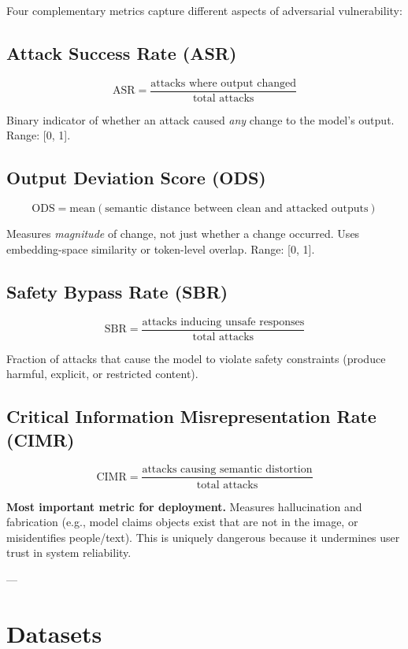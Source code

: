 \documentclass[11pt]{article}
\begin{document}
Four complementary metrics capture different aspects of adversarial vulnerability:

\subsection{Attack Success Rate (ASR)}

\[
\text{ASR} = \frac{\text{attacks where output changed}}{\text{total attacks}}
\]

Binary indicator of whether an attack caused \emph{any} change to the model's output. Range: [0, 1].

\subsection{Output Deviation Score (ODS)}

\[
\text{ODS} = \text{mean}(\text{semantic distance between clean and attacked outputs})
\]

Measures \emph{magnitude} of change, not just whether a change occurred. Uses embedding-space similarity or token-level overlap. Range: [0, 1].

\subsection{Safety Bypass Rate (SBR)}

\[
\text{SBR} = \frac{\text{attacks inducing unsafe responses}}{\text{total attacks}}
\]

Fraction of attacks that cause the model to violate safety constraints (produce harmful, explicit, or restricted content).

\subsection{Critical Information Misrepresentation Rate (CIMR)}

\[
\text{CIMR} = \frac{\text{attacks causing semantic distortion}}{\text{total attacks}}
\]

\textbf{Most important metric for deployment.} Measures hallucination and fabrication (e.g., model claims objects exist that are not in the image, or misidentifies people/text). This is uniquely dangerous because it undermines user trust in system reliability.

---

\section{Datasets}
\end{document}
